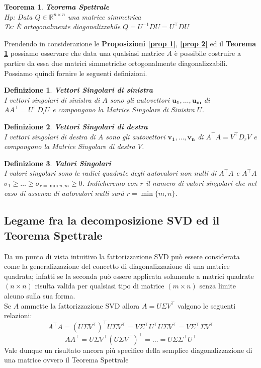 \documentclass[11pt]{article}
\newtheorem{theorem}{Teorema}
\newtheorem{definition}{Definizione}
\begin{document}
\begin{theorem}\label{teo spetr}
\textbf{Teorema Spettrale}\\
\textit{Hp:} Data $Q\in\mathbb{R}^{n\times n}$ una matrice simmetrica\\
\textit{Ts:} È ortogonalmente diagonalizzabile $Q=U^{-1}DU=U^\top      DU$
\end{theorem}
\noindent
Prendendo in considerazione le \textbf{Proposizioni \autoref{prop 1}}, \textbf{\autoref{prop 2}} ed il \textbf{Teorema \ref{teo spetr}} possiamo osservare che data una qualsiasi matrice $A$ è possibile costruire a partire da essa due matrici simmetriche ortogonalmente diagonalizzabili. Possiamo quindi fornire le seguenti definizioni.
\begin{definition}
	\textbf{Vettori Singolari di sinistra}\\ I vettori singolari di sinistra di $A$ sono gli autovettori $\mathbf{u_1, \dots ,u_m}$ di $AA^\top      =U^\top      D_lU$ e compongono la \textit{Matrice Singolare di Sinistra} $U$.
\end{definition}
\begin{definition}
	\textbf{Vettori Singolari di destra}\\ I vettori singolari di destra di $A$ sono gli autovettori $\mathbf{v_1, \dots ,v_n}$ di $A^\top      A=V^\top      D_rV$ e compongono la \textit{Matrice Singolare di destra} $V$.
\end{definition}
\begin{definition}
	\textbf{Valori Singolari}\\ I valori singolari sono le radici quadrate degli autovalori non nulli di $A^\top      A$ e $A^\top      A$\\ $\sigma_1 \geq \dots \geq \sigma_{r=\min{n,m}} \geq 0$. Indicheremo con $r$ il numero di valori singolari che nel caso di assenza di autovalori nulli sarà $r=\min{\{m,n\}}$.
\end{definition}

\subsection{Legame fra la decomposizione SVD ed il Teorema Spettrale}
Da un punto di vista intuitivo la fattorizzazione SVD può essere considerata come la generalizzazione del concetto di diagonalizzazione di una matrice quadrata; infatti se la seconda può essere applicata solamente a matrici quadrate $(n \times n)$ risulta valida per qualsiasi tipo di matrice $(m \times n)$ senza limite alcuno sulla sua forma.\\
Se $A$ ammette la fattorizzazione SVD allora $A=U\Sigma V^\top      $ valgono le seguenti relazioni: $$A^\top      A=(U\Sigma V^\top      )^\top      U\Sigma V^\top      =V\Sigma^\top      U^\top      U\Sigma V^\top      =V\Sigma^\top       \Sigma V^\top      $$
$$ AA^\top      =U\Sigma V^\top      (U\Sigma V^\top      )^\top      =\dots=U\Sigma \Sigma^\top       U^\top      $$ 
Vale dunque un risultato ancora più specifico della semplice diagonalizzazione di una matrice ovvero il Teorema Spettrale
\end{document}
